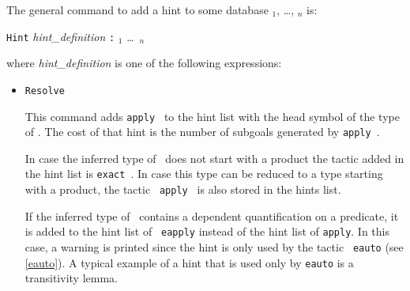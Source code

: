 The general
command to add a hint to some database \ident$_1$, \dots, \ident$_n$ is:
\begin{tabbing}
  \texttt{Hint} \textsl{hint\_definition} \texttt{:} \ident$_1$ \ldots\ \ident$_n$
\end{tabbing}
where {\sl hint\_definition} is one of the following expressions:

\begin{itemize}
\item \texttt{Resolve} {\term} 
  
  This command adds {\tt apply {\term}} to the hint list
  with the head symbol of the type of \term. The cost of that hint is
  the number of subgoals generated by {\tt apply {\term}}.
  
  In case the inferred type of \term\ does not start with a product the
  tactic added in the hint list is {\tt exact {\term}}. In case this
  type can be reduced to a type starting with a product, the tactic {\tt
    apply {\term}} is also stored in the hints list.
  
  If the inferred type of \term\ contains a dependent
  quantification on a predicate, it is added to the hint list of {\tt
    eapply} instead of the hint list of {\tt apply}. In this case, a
  warning is printed since the hint is only used by the tactic {\tt
    eauto} (see \ref{eauto}). A typical example of a hint that is used
  only by \texttt{eauto} is a transitivity lemma.


\end{itemize}

